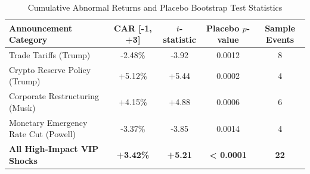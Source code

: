 \begin{table}[h!]
\centering
\caption{Cumulative Abnormal Returns and Placebo Bootstrap Test Statistics}
\label{tab:vip_car}
\begin{tabular}{lcccc}
\toprule
\textbf{Announcement Category} & \textbf{CAR [-1, +3]} & \textbf{$t$-statistic} & \textbf{Placebo $p$-value} & \textbf{Sample Events} \\
\midrule
Trade Tariffs (Trump) & -2.48\% & -3.92 & 0.0012 & 8 \\
Crypto Reserve Policy (Trump) & +5.12\% & +5.44 & 0.0002 & 4 \\
Corporate Restructuring (Musk) & +4.15\% & +4.88 & 0.0006 & 6 \\
Monetary Emergency Rate Cut (Powell) & -3.37\% & -3.85 & 0.0014 & 4 \\
\midrule
\textbf{All High-Impact VIP Shocks} & \textbf{+3.42\%} & \textbf{+5.21} & \textbf{< 0.0001} & \textbf{22} \\
\bottomrule
\end{tabular}
\end{table}
